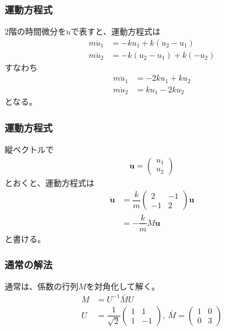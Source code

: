 \documentclass[12pt, t]{beamer}
\newcommand{\lr}[1]{\left({}#1\right){}}
\begin{document}
\begin{frame}
\frametitle{運動方程式}
$2$階の時間微分を$\ddot{u}$で表すと、運動方程式は
\begin{align}
  m \ddot{u}_1 &= -k u_1 + k (u_2 - u_1) \\
  m \ddot{u}_2 &= -k (u_2 - u_1) + k (-u_2)
\end{align}
すなわち
\begin{align}
  m \ddot{u}_1 &= -2k u_1 + k u_2 \\
  m \ddot{u}_2 &= k u_1 - 2k u_2
\end{align}
となる。
\end{frame}

\begin{frame}
\frametitle{運動方程式}
縦ベクトルで
\begin{align}
  \bm{u} = \lr{
  \begin{array}{c}
    u_1 \\
    u_2
  \end{array}}
\end{align}
とおくと、運動方程式は
\begin{align}
  \ddot{\bm{u}} &= \dfrac{k}{m} \lr{
  \begin{array}{cc}
    2 & -1 \\
    -1 & 2
  \end{array}} \bm{u} \\
  &= -\dfrac{k}{m} M \bm{u}
\end{align}
と書ける。
\end{frame}

\begin{frame}
\frametitle{通常の解法}
通常は、係数の行列$M$を対角化して解く。
\begin{align}
  M &= U^{-1} \bar{M} U \\
  U &= \dfrac{1}{\sqrt{2}}
  \lr{\begin{array}{cc}
        1 & 1 \\
        1 & -1
      \end{array}},\ 
  \bar{M} =
  \lr{\begin{array}{cc}
        1 & 0 \\
        0 & 3
      \end{array}} \\
\end{align}
\end{frame}
\end{document}
